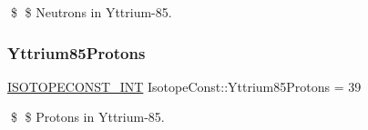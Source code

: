 \$ \$ Neutrons in Yttrium-\/85. \mbox{\label{group___isotope_const-_yttrium-_y85_gadbf5e0982cf751bc96443af5cf384a85}} 
\subsubsection{\texorpdfstring{Yttrium85\+Protons}{Yttrium85Protons}}
{\footnotesize\ttfamily \mbox{\hyperlink{group___isotope_const-_macros_ga5f18360b3e99483a35c32d789e62621c}{I\+S\+O\+T\+O\+P\+E\+C\+O\+N\+S\+T\+\_\+\+I\+NT}} Isotope\+Const\+::\+Yttrium85\+Protons = 39}

\$ \$ Protons in Yttrium-\/85. 